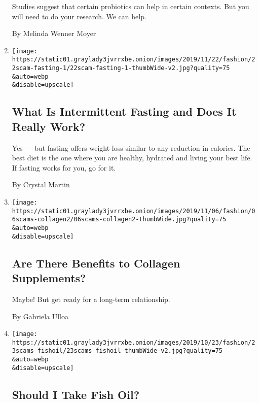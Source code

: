 \begin{enumerate}
  Studies suggest that certain probiotics can help in certain contexts.
  But you will need to do your research. We can help.

  By Melinda Wenner Moyer
\item
  \href{/2019/11/23/style/self-care/intermittent-fasting-benefits.html}{}

  \texttt{[image: https://static01.graylady3jvrrxbe.onion/images/2019/11/22/fashion/22scam-fasting-1/22scam-fasting-1-thumbWide-v2.jpg?quality=75\\\&auto=webp\\\&disable=upscale]}

  \hypertarget{what-is-intermittent-fasting-and-does-it-really-work}{%
  \subsection{What Is Intermittent Fasting and Does It Really
  Work?}\label{what-is-intermittent-fasting-and-does-it-really-work}}

  Yes --- but fasting offers weight loss similar to any reduction in
  calories. The best diet is the one where you are healthy, hydrated and
  living your best life. If fasting works for you, go for it.

  By Crystal Martin
\item
  \href{/2019/11/09/style/self-care/collagen-benefits.html}{}

  \texttt{[image: https://static01.graylady3jvrrxbe.onion/images/2019/11/06/fashion/06scams-collagen2/06scams-collagen2-thumbWide.jpg?quality=75\\\&auto=webp\\\&disable=upscale]}

  \hypertarget{are-there-benefits-to-collagen-supplements}{%
  \subsection{Are There Benefits to Collagen
  Supplements?}\label{are-there-benefits-to-collagen-supplements}}

  Maybe! But get ready for a long-term relationship.

  By Gabriela Ulloa
\item
  \href{/2019/11/01/style/self-care/fish-oil-benefits.html}{}

  \texttt{[image: https://static01.graylady3jvrrxbe.onion/images/2019/10/23/fashion/23scams-fishoil/23scams-fishoil-thumbWide-v2.jpg?quality=75\\\&auto=webp\\\&disable=upscale]}

  \hypertarget{should-i-take-fish-oil}{%
  \subsection{Should I Take Fish Oil?}\label{should-i-take-fish-oil}}


\end{enumerate}
